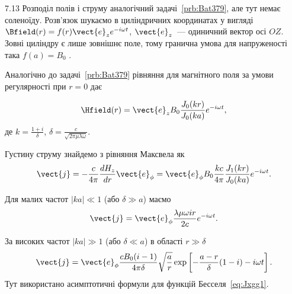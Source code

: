 \begin{Solution}{7.{13}}
		Розподіл полів і струму аналогічний задачі~\ref{prb:Bat379}, але тут немає соленоїду. Розв’язок шукаємо в циліндричних координатах у вигляді  $\Bfield(r) = f(r)\vect{e}_ze^{- i\omega t}$,  $\vect{e}_z$~--- одиничний вектор  осі $OZ$. Зовні циліндру є лише зовнішнє поле, тому  гранична умова для напруженості така $f(a) = B_0$ .

		Аналогічно до задачі~\ref{prb:Bat379} рівняння для магнітного поля за умови регулярності при $r = 0$ дає

		\[
			\Hfield(r) = \vect{e}_z{B_0}\frac{{{J_0}(kr)}}{{{J_0}(ka)}} e^{ - i\omega t},
		\]
		де $ k = \frac{1 + i}{\delta}$, $\delta = \frac{c}{\sqrt {2\pi \mu \lambda \omega}}$.

		Густину струму знайдемо з рівняння Максвела як
		\[
			\vect{j}=  - \frac{c}{4\pi}\frac{dH_z}{dr}\vect{e}_\phi = \vect{e}_\phi B_0\frac{kc}{4\pi }\frac{J_1(kr)}{J_0(ka)}e^{ - i\omega t}.
		\]

		Для малих частот $|ka| \ll 1$ (або $\delta \gg a$) маємо
		\[
			\vect{j} = \vect{e}_\phi\frac{\lambda \mu \omega ir}{{2c}}e^{ - i\omega t}.
		\]

		За високих частот $|ka| \gg 1$ (або $\delta \ll a$) в області $r \gg \delta$
		\[
			\vect{j}=  \vect{e}_\phi\frac{{c{B_0}(i - 1)}}{{4\pi \delta }}\sqrt {\frac{a}{r}} \exp \left[ { - \frac{{a - r}}{\delta }(1 - i) - i\omega t} \right].
		\]
		Тут використано асимптотичні формули для функцій Бесселя~\eqref{eq:Jxgg1}.

	
\end{Solution}
